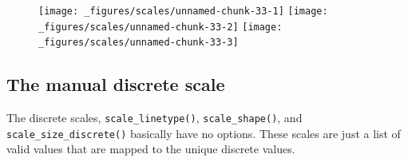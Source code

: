 \begin{Shaded}
\begin{Highlighting}[]
\StringTok{ }\NormalTok{(} \NormalTok{:}\NormalTok{, } \NormalTok{:}\NormalTok{, } \NormalTok{(}\NormalTok{, }\NormalTok{, }\NormalTok{))}
\StringTok{ }\StringTok{ }
\StringTok{  }\NormalTok{(}\NormalTok{(}  \NormalTok{) +}\StringTok{ }
\StringTok{  }\NormalTok{(} \NormalTok{) +}
\StringTok{  }\NormalTok{(} \NormalTok{, } \NormalTok{)}
\StringTok{ }\NormalTok{(} \NormalTok{)}
\StringTok{ }\NormalTok{(} \NormalTok{)}
\StringTok{ }\NormalTok{(} \NormalTok{)}
\end{Highlighting}
\end{Shaded}

\begin{figure}[H]
  \texttt{[image: \_figures/scales/unnamed-chunk-33-1]}%
  \texttt{[image: \_figures/scales/unnamed-chunk-33-2]}%
  \texttt{[image: \_figures/scales/unnamed-chunk-33-3]}
\end{figure}

\subsection{The manual discrete scale}\label{sub:scale-manual}

The discrete scales, \texttt{scale\_linetype()},
\texttt{scale\_shape()}, and \texttt{scale\_size\_discrete()} basically
have no options. These scales are just a list of valid values that are
mapped to the unique discrete values.  
 
 

